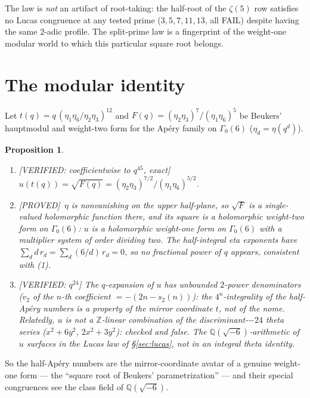 \documentclass[11pt,reqno]{amsart}
\theoremstyle{plain}
\newtheorem{proposition}[theorem]{Proposition}
\theoremstyle{definition}
\theoremstyle{remark}
\newcommand{\Z}{\mathbb{Z}}
\newcommand{\Q}{\mathbb{Q}}
\newcommand{\Proved}{\textup{\textsf{[PROVED]}}}
\newcommand{\VerifiedR}[1]{\textup{\textsf{[VERIFIED: #1]}}}
\begin{document}
The law is \emph{not} an artifact of root-taking: the half-root of the
$\zeta(5)$ row satisfies no Lucas congruence at any tested prime
($3,5,7,11,13$, all FAIL) despite having the same $2$-adic profile. The
split-prime law is a fingerprint of the weight-one modular world to which
this particular square root belongs.

\section{The modular identity}\label{sec:modular}

Let $t(q)=q\,(\eta_1\eta_6/\eta_2\eta_3)^{12}$ and
$F(q)=(\eta_2\eta_3)^7/(\eta_1\eta_6)^5$ be Beukers' hauptmodul and
weight-two form for the Ap\'ery family on $\Gamma_0(6)$
($\eta_d=\eta(q^d)$).

\begin{proposition}\label{prop:modular}
\begin{enumerate}[leftmargin=2em]
\item \VerifiedR{coefficientwise to $q^{45}$, exact}
$u(t(q))=\sqrt{F(q)}
=(\eta_2\eta_3)^{7/2}\bigl/(\eta_1\eta_6)^{5/2}$.
\item \Proved\ $\eta$ is nonvanishing on the upper half-plane, so
$\sqrt F$ is a single-valued holomorphic function there, and its square is
a holomorphic weight-two form on $\Gamma_0(6)$: $u$ is a holomorphic
weight-\emph{one} form on $\Gamma_0(6)$ with a multiplier system of order
dividing two. The half-integral eta exponents have
$\sum_d d\,r_d=\sum_d(6/d)\,r_d=0$, so no fractional power of $q$ appears,
consistent with (1).
\item \VerifiedR{$q^{24}$} The $q$-expansion of $u$ has \emph{unbounded}
$2$-power denominators ($v_2$ of the $n$-th coefficient
$=-(2n-s_2(n))$): the $4^n$-integrality of the half-Ap\'ery numbers is a
property of the \emph{mirror coordinate} $t$, not of the nome. Relatedly,
$u$ is not a $\Z$-linear combination of the discriminant-$-24$ theta
series ($x^2+6y^2$, $2x^2+3y^2$): checked and false. The
$\Q(\sqrt{-6})$-arithmetic of $u$ surfaces in the Lucas law of
\S\ref{sec:lucas}, not in an integral theta identity.
\end{enumerate}
\end{proposition}

So the half-Ap\'ery numbers are the mirror-coordinate avatar of a genuine
weight-one form --- the ``square root of Beukers' parametrization'' ---
and their special congruences see the class field of $\Q(\sqrt{-6})$.
\end{document}
